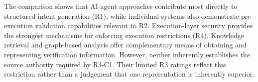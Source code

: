 \begin{table}[H]
\centering
\renewcommand{\arraystretch}{1.4}
\caption{Requirement coverage of the reviewed approach groups
according to the assessment criteria defined in
Section~\ref{sec:requirements_analysis}.}
\label{tab:requirements_approach_comparison}
\end{table}



The comparison shows that AI-agent approaches contribute
most directly to structured intent generation (R1),
while individual systems also demonstrate pre-execution
validation capabilities relevant to R2. Execution-layer
security provides the strongest mechanisms for enforcing
execution restrictions (R4). Knowledge retrieval and
graph-based analysis offer complementary means of obtaining
and representing verification information. However, neither
inherently establishes the source authority required by
R3-C1. Their limited R3 ratings reflect this restriction
rather than a judgement that one representation is
inherently superior.

